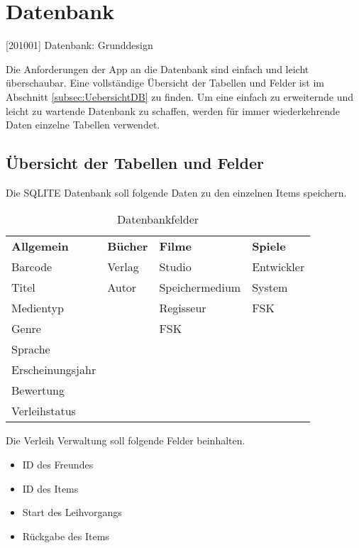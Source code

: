 \section{Datenbank}

[201001] Datenbank: Grunddesign

Die Anforderungen der App an die Datenbank sind einfach und leicht überschaubar. Eine vollständige Übersicht der Tabellen und Felder ist im Abschnitt \ref{subsec:UebersichtDB} zu finden. Um eine einfach zu erweiternde und leicht zu wartende Datenbank zu schaffen, werden für immer wiederkehrende Daten einzelne Tabellen verwendet.

\subsection{Übersicht der Tabellen und Felder}
\label{sec:Felder}

Die SQLITE Datenbank soll folgende Daten zu den einzelnen Items speichern.

\begin{table} [htbp]
	\begin{center}
		\begin{tabular}{|l|l|l|l|}
			\rowcolor{black} {\color{white}\textbf{Allgemein}} & {\color{white}\textbf{Bücher}} & {\color{white}\textbf{Filme}} & {\color{white}\textbf{Spiele}} \\
			Barcode & Verlag & Studio & Entwickler\\ \hline
			\rowcolor{DarkSeaGreen} Titel & Autor & Speichermedium & System \\ \hline		
			Medientyp & & Regisseur & FSK \\ \hline
			\rowcolor{DarkSeaGreen} Genre & & FSK & \\ \hline
			Sprache & & & \\ \hline
			\rowcolor{DarkSeaGreen} Erscheinungsjahr & & & \\ \hline
			Bewertung & & & \\ \hline
			\rowcolor{DarkSeaGreen} Verleihstatus & & & \\ \hline
		\end{tabular}
	\caption{Datenbankfelder}
	\label{tab:Datenbankfelder}
	\end{center}
\end{table}

Die Verleih Verwaltung soll folgende Felder beinhalten.

\begin{itemize}
	\item ID des Freundes
	\item ID des Items
	\item Start des Leihvorgangs
	\item Rückgabe des Items
\end{itemize} 

